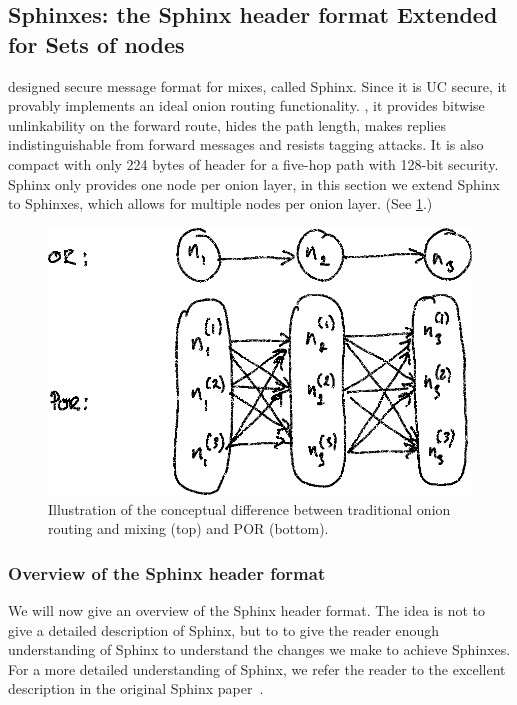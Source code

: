 \subsection{Sphinxes: the Sphinx header format Extended for Sets of nodes}%
\label{Sphinxes}

\Textcite{Sphinx} designed  secure message format for mixes, called 
Sphinx.
Since it is \ac{UC} secure, it provably implements an ideal onion routing 
functionality.
\Ie, it provides bitwise unlinkability on the forward route, hides the path 
length, makes replies indistinguishable from forward messages and resists 
tagging attacks.
It is also compact with only 224 bytes of header for a five-hop path with 
128-bit security.
Sphinx only provides one node per onion layer, in this section we extend Sphinx 
to Sphinxes, which allows for multiple nodes per onion layer.
(See \cref{fig:OR-POR}.)

\begin{figure}
  \includegraphics[width=\linewidth]{figures/OR-POR.png}
  \caption{\label{fig:OR-POR}%
    Illustration of the conceptual difference between traditional onion routing 
    and mixing (top) and \ac{POR} (bottom).
  }
\end{figure}

\subsubsection{Overview of the Sphinx header format}

We will now give an overview of the Sphinx header format.
The idea is not to give a detailed description of Sphinx, but to to give the 
reader enough understanding of Sphinx to understand the changes we make to 
achieve Sphinxes.
For a more detailed understanding of Sphinx, we refer the reader to the 
excellent description in the original Sphinx paper~\cite{Sphinx}.

